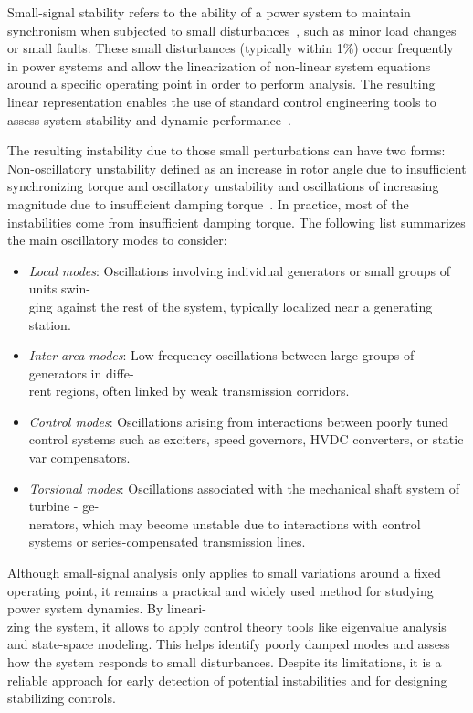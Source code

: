 Small-signal stability refers to the ability of a power system to maintain synchronism when subjected to 
small disturbances~\cite{StabilityAndControlKundur}, such as minor load changes or small faults. These small disturbances
(typically within 1\%) occur frequently in power systems and allow the linearization of non-linear system equations
 around a specific operating point in order to perform analysis. The resulting linear representation enables the use
  of standard control engineering tools to assess system stability and dynamic performance~\cite{SmallSignalCheah}.

The resulting instability due to those small perturbations can have two forms: Non-oscillatory unstability defined as an 
increase in rotor angle due to insufficient synchronizing torque and oscillatory unstability and oscillations of 
increasing magnitude due to insufficient damping torque~\cite{StabilityAndControlKundur}. In practice, most of the 
instabilities come from insufficient damping torque. The following list summarizes the main oscillatory modes to consider:

\begin{itemize}
    \item \textit{Local modes}: Oscillations involving individual generators or small groups of units swin-\\ging 
    against the rest of the system, typically localized near a generating station.
    \item \textit{Inter area modes}: Low-frequency oscillations between large groups of generators in diffe-\\rent 
    regions, often linked by weak transmission corridors.
    \item \textit{Control modes}: Oscillations arising from interactions between poorly tuned control systems such 
    as exciters, speed governors, HVDC converters, or static var compensators.
    \item \textit{Torsional modes}: Oscillations associated with the mechanical shaft system of turbine - ge-\\nerators, which may become unstable due to interactions with control systems or series-compensated transmission lines.
\end{itemize}


Although small-signal analysis only applies to small variations around a fixed operating point, 
it remains a practical and widely used method for studying power system dynamics. By lineari-\\zing the system,
it allows to apply control theory tools like eigenvalue analysis and state-space modeling. 
This helps identify poorly damped modes and assess how the system responds to small disturbances. Despite its limitations,
it is a reliable approach for early detection of potential instabilities and for designing stabilizing controls.



